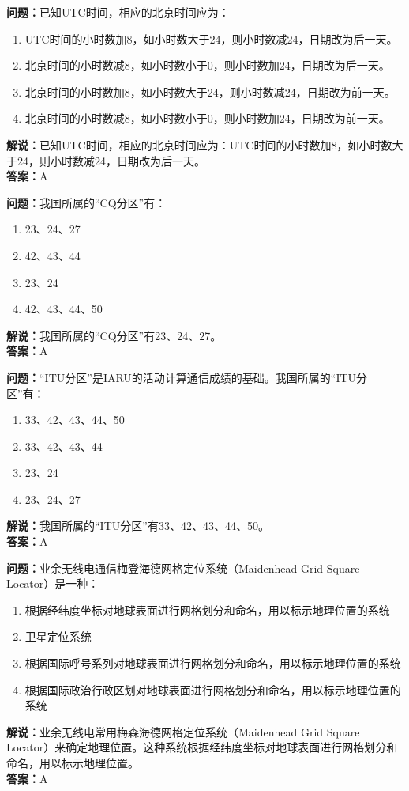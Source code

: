 \documentclass{ctexbook}%
\begin{document}
\textbf{问题：}已知UTC时间，相应的北京时间应为：
\begin{enumerate}[label=\Alph*), leftmargin=3em]
\item UTC时间的小时数加8，如小时数大于24，则小时数减24，日期改为后一天。
\item 北京时间的小时数减8，如小时数小于0，则小时数加24，日期改为后一天。
\item 北京时间的小时数加8，如小时数大于24，则小时数减24，日期改为前一天。
\item 北京时间的小时数减8，如小时数小于0，则小时数加24，日期改为前一天。
\end{enumerate}
\textbf{解说：}已知UTC时间，相应的北京时间应为：UTC时间的小时数加8，如小时数大于24，则小时数减24，日期改为后一天。\\
\textbf{答案：}A

\textbf{问题：}我国所属的“CQ分区”有：
\begin{enumerate}[label=\Alph*), leftmargin=3em]
\item 23、24、27
\item 42、43、44
\item 23、24
\item 42、43、44、50
\end{enumerate}
\textbf{解说：}我国所属的“CQ分区”有23、24、27。\\
\textbf{答案：}A

\textbf{问题：}“ITU分区”是IARU的活动计算通信成绩的基础。我国所属的“ITU分区”有：
\begin{enumerate}[label=\Alph*), leftmargin=3em]
\item 33、42、43、44、50
\item 33、42、43、44
\item 23、24
\item 23、24、27
\end{enumerate}
\textbf{解说：}我国所属的“ITU分区”有33、42、43、44、50。\\
\textbf{答案：}A

\textbf{问题：}业余无线电通信梅登海德网格定位系统（Maidenhead Grid Square Locator）是一种：
\begin{enumerate}[label=\Alph*), leftmargin=3em]
\item 根据经纬度坐标对地球表面进行网格划分和命名，用以标示地理位置的系统
\item 卫星定位系统
\item 根据国际呼号系列对地球表面进行网格划分和命名，用以标示地理位置的系统
\item 根据国际政治行政区划对地球表面进行网格划分和命名，用以标示地理位置的系统
\end{enumerate}
\textbf{解说：}业余无线电常用梅森海德网格定位系统（Maidenhead Grid Square Locator）来确定地理位置。这种系统根据经纬度坐标对地球表面进行网格划分和命名，用以标示地理位置。\\
\textbf{答案：}A
\end{document}
